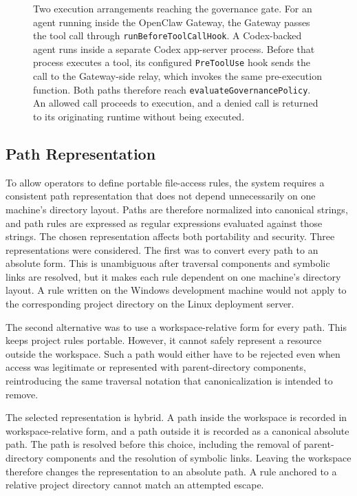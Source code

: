 \begin{figure}[htbp]
{%
}
\caption[Two execution arrangements reaching the governance gate]
{\footnotesize Two execution arrangements reaching the governance gate.
For an agent running inside the OpenClaw Gateway, the Gateway passes the tool
call through \texttt{runBeforeToolCallHook}. A Codex-backed agent runs
inside a separate Codex app-server process. Before that process executes a
tool, its configured \texttt{PreToolUse} hook sends the call to the
Gateway-side relay, which invokes the same pre-execution function. Both paths therefore reach \texttt{evaluateGovernancePolicy}. An allowed call proceeds to
execution, and a denied call is returned to its originating runtime without
being executed.}
\label{fig:gov-twopaths}
\end{figure}
\subsection{Path Representation}
\label{sec:gov-path-representation}

To allow operators to define portable file-access rules, the system requires a
consistent path representation that does not depend unnecessarily on one
machine's directory layout. Paths are therefore normalized into canonical
strings, and path rules are expressed as regular expressions evaluated against
those strings. The chosen representation affects both portability and
security. Three
representations were considered. The first was to convert every path to an
absolute form. This is unambiguous after traversal components and symbolic
links are resolved, but it makes each rule dependent on one machine's directory
layout. A rule written on the Windows development machine would not apply to
the corresponding project directory on the Linux deployment server.

The second alternative was to use a workspace-relative form for every path.
This keeps project rules portable. However, it cannot safely represent a resource outside the workspace. Such a path would either have to be rejected even when access was
legitimate or represented with parent-directory components, reintroducing the
same traversal notation that canonicalization is intended to remove.

The selected representation is hybrid. A path inside the workspace is recorded
in workspace-relative form, and a path outside it is recorded as a canonical
absolute path. The path is resolved before this choice, including the removal of parent-directory components and the resolution of symbolic links. Leaving the workspace therefore changes the representation to an absolute path. A rule
anchored to a relative project directory cannot match an attempted escape.

